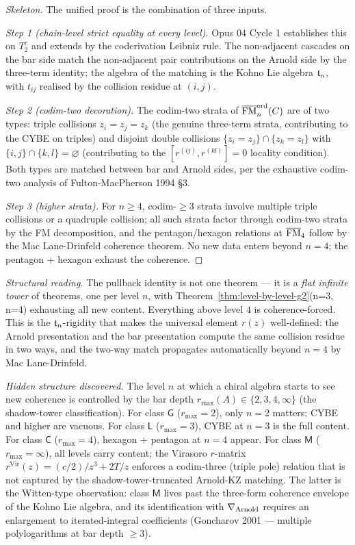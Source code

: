\begin{proof}[Skeleton]
The unified proof is the combination of three inputs.

\emph{Step 1 (chain-level strict equality at every level).}
Opus 04 Cycle 1 establishes this on $T^c_2$ and extends by the
coderivation Leibniz rule. The non-adjacent cascades on the bar side
match the non-adjacent pair contributions on the Arnold side by the
three-term identity; the algebra of the matching is the Kohno Lie
algebra $\mathfrak{t}_n$, with $t_{ij}$ realised by the collision residue at
$(i,j)$.

\emph{Step 2 (codim-two decoration).}
The codim-two strata of $\overline{\mathrm{FM}}_n^{\mathrm{ord}}(C)$ are of two types:
triple collisions $z_i = z_j = z_k$ (the genuine three-term strata,
contributing to the CYBE on triples) and disjoint double collisions
$\{z_i = z_j\} \cap \{z_k = z_l\}$ with $\{i,j\} \cap \{k,l\} = \varnothing$
(contributing to the $[r^{(ij)}, r^{(kl)}] = 0$ locality condition).
Both types are matched between bar and Arnold sides, per the exhaustive
codim-two analysis of Fulton-MacPherson 1994 \S3.

\emph{Step 3 (higher strata).}
For $n \ge 4$, codim-$\ge 3$ strata involve multiple triple collisions
or a quadruple collision; all such strata factor through codim-two
strata by the FM decomposition, and the pentagon/hexagon relations at
$\overline{\mathrm{FM}}_4$ follow by the Mac Lane-Drinfeld coherence theorem. No new data
enters beyond $n = 4$; the pentagon + hexagon exhaust the coherence.
\end{proof}

\emph{Structural reading.}
The pullback identity is not one theorem --- it is a
\emph{flat infinite tower} of theorems, one per level $n$, with
Theorem~\ref{thm:level-by-level-g2}(n=3, n=4) exhausting all new
content. Everything above level $4$ is coherence-forced. This is the
$\mathfrak{t}_n$-rigidity that makes the universal element $r(z)$ well-defined:
the Arnold presentation and the bar presentation compute the same
collision residue in two ways, and the two-way match propagates
automatically beyond $n = 4$ by Mac Lane-Drinfeld.

\emph{Hidden structure discovered.}
The level $n$ at which a chiral algebra starts to see new coherence is
controlled by the bar depth $r_{\max}(A) \in \{2, 3, 4, \infty\}$ (the
shadow-tower classification). For class $\mathsf{G}$ ($r_{\max} = 2$),
only $n = 2$ matters; CYBE and higher are vacuous. For class $\mathsf{L}$
($r_{\max} = 3$), CYBE at $n = 3$ is the full content. For class
$\mathsf{C}$ ($r_{\max} = 4$), hexagon + pentagon at $n = 4$ appear.
For class $\mathsf{M}$ ($r_{\max} = \infty$), all levels carry content;
the Virasoro $r$-matrix $r^{\mathrm{Vir}}(z) = (c/2)/z^3 + 2T/z$ enforces
a codim-three (triple pole) relation that is not captured by the
shadow-tower-truncated
Arnold-KZ matching. The latter is the Witten-type observation: class
$\mathsf{M}$ lives past the three-form coherence envelope of the Kohno
Lie algebra, and its identification with $\nabla_{\mathrm{Arnold}}$ requires an
enlargement to iterated-integral coefficients (Goncharov 2001 --- multiple
polylogarithms at bar depth $\ge 3$).

